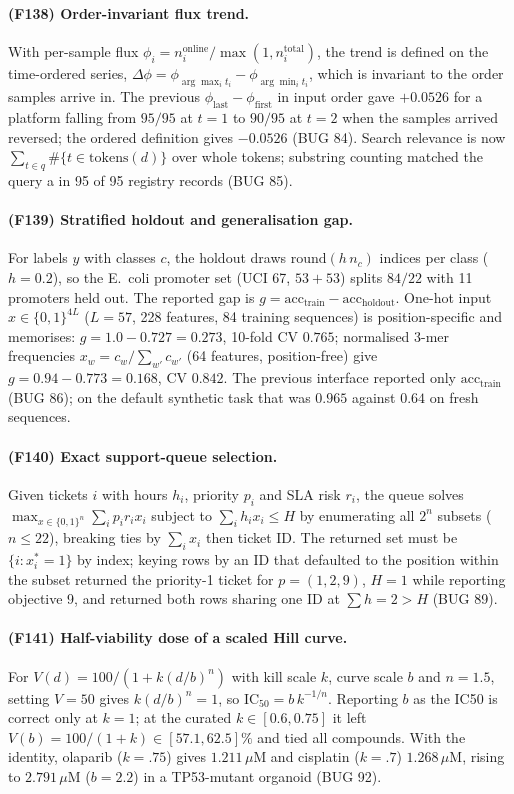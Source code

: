 \paragraph{(F138) Order-invariant flux trend.} With per-sample flux $\phi_i=n^{\mathrm{online}}_i/\max(1,n^{\mathrm{total}}_i)$, the trend is defined on the time-ordered series, $\Delta\phi=\phi_{\arg\max_i t_i}-\phi_{\arg\min_i t_i}$, which is invariant to the order samples arrive in. The previous $\phi_{\mathrm{last}}-\phi_{\mathrm{first}}$ in input order gave $+0.0526$ for a platform falling from $95/95$ at $t=1$ to $90/95$ at $t=2$ when the samples arrived reversed; the ordered definition gives $-0.0526$ (BUG 84). Search relevance is now $\sum_{t\in q}\#\{t\in\mathrm{tokens}(d)\}$ over whole tokens; substring counting matched the query a in 95 of 95 registry records (BUG 85).
\paragraph{(F139) Stratified holdout and generalisation gap.} For labels $y$ with classes $c$, the holdout draws $\mathrm{round}(h\,n_c)$ indices per class ($h=0.2$), so the E.~coli promoter set (UCI 67, $53{+}53$) splits $84/22$ with 11 promoters held out. The reported gap is $g=\mathrm{acc}_{\mathrm{train}}-\mathrm{acc}_{\mathrm{holdout}}$. One-hot input $x\in\{0,1\}^{4L}$ ($L=57$, 228 features, 84 training sequences) is position-specific and memorises: $g=1.0-0.727=0.273$, 10-fold CV $0.765$; normalised 3-mer frequencies $x_w=c_w/\sum_{w\prime} c_{w\prime}$ (64 features, position-free) give $g=0.94-0.773=0.168$, CV $0.842$. The previous interface reported only $\mathrm{acc}_{\mathrm{train}}$ (BUG 86); on the default synthetic task that was $0.965$ against $0.64$ on fresh sequences.
\paragraph{(F140) Exact support-queue selection.} Given tickets $i$ with hours $h_i$, priority $p_i$ and SLA risk $r_i$, the queue solves $\max_{x\in\{0,1\}^n}\sum_i p_i r_i x_i$ subject to $\sum_i h_i x_i\le H$ by enumerating all $2^n$ subsets ($n\le 22$), breaking ties by $\sum_i x_i$ then ticket ID. The returned set must be $\{i: x^\ast_i=1\}$ by index; keying rows by an ID that defaulted to the position within the subset returned the priority-1 ticket for $p=(1,2,9)$, $H=1$ while reporting objective 9, and returned both rows sharing one ID at $\sum h=2>H$ (BUG 89).
\paragraph{(F141) Half-viability dose of a scaled Hill curve.} For $V(d)=100/(1+k(d/b)^{n})$ with kill scale $k$, curve scale $b$ and $n=1.5$, setting $V=50$ gives $k(d/b)^{n}=1$, so $\mathrm{IC}_{50}=b\,k^{-1/n}$. Reporting $b$ as the IC50 is correct only at $k=1$; at the curated $k\in[0.6,0.75]$ it left $V(b)=100/(1+k)\in[57.1,62.5]\%$ and tied all compounds. With the identity, olaparib ($k=.75$) gives $1.211\,\mu$M and cisplatin ($k=.7$) $1.268\,\mu$M, rising to $2.791\,\mu$M ($b=2.2$) in a TP53-mutant organoid (BUG 92).
